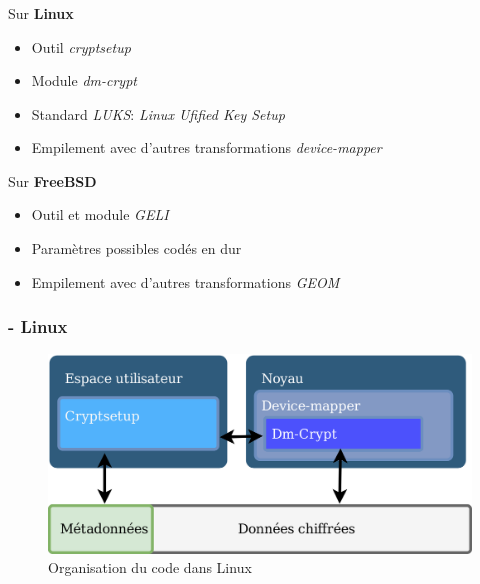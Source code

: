 \begin{frame}
  \frametitle{\insertsubsectionhead}
  \pause
  \begin{block}{Sur \textbf{Linux}}
    \begin{itemize}
      \pause
    \item Outil \textit{cryptsetup}
    \item Module \textit{dm-crypt}
    \item Standard \textit{LUKS}: \textit{Linux Ufified Key Setup}
    \item Empilement avec d'autres transformations \textit{device-mapper}
    \end{itemize}
  \end{block}
  \pause
  \begin{block}{Sur \textbf{FreeBSD}}
    \begin{itemize}
      \pause
    \item Outil et module \textit{GELI}
    \item Paramètres possibles codés en dur
    \item Empilement avec d'autres transformations \textit{GEOM}
    \end{itemize}
  \end{block}
\end{frame}

\begin{frame}
  \frametitle{\insertsubsectionhead - \textbf{Linux}}
  \begin{figure}
    \includegraphics[width=\textwidth]{etat_art/organisation_linux}
    \caption{Organisation du code dans Linux}
  \end{figure}
\end{frame}

